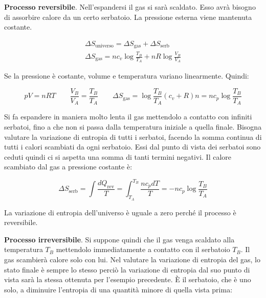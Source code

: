 \begin{figure}[htpb]
\end{figure}
\FloatBarrier

\textbf{Processo reversibile}. Nell'espandersi il gas si sarà scaldato. Esso avrà bisogno di assorbire calore da un certo serbatoio. La pressione esterna viene mantenuta costante.

\begin{gather*}
	\Delta S_{\text{universo} } = \Delta S_{\text{gas} } + \Delta S_{\text{serb} } \\
	\Delta S_{\text{gas} } = nc_v \log \frac{T_B }{T_A } + nR\log \frac{V_B }{V_A }
\end{gather*}

Se la pressione è costante, volume e temperatura variano linearmente. Quindi:

\[
	pV=nRT \qquad \frac{V_B }{V_A } = \frac{T_B }{T_A } \qquad \Delta S_{\text{gas} } = \log \frac{T_B }{T_A }(c_v+R)n = nc_p\log \frac{T_B }{T_A }
\]

Si fa espandere in maniera molto lenta il gas mettendolo a contatto con infiniti serbatoi, fino a che non si passa dalla temperatura iniziale a quella finale. Bisogna valutare la variazione di entropia di tutti i serbatoi, facendo la somma continua di tutti i calori scambiati da ogni serbatoio. Essi dal punto di vista dei serbatoi sono ceduti quindi ci si aspetta una somma di tanti termini negativi. Il calore scambiato dal gas a pressione costante è:

\[
	\Delta S_{\text{serb} } = \int \frac{dQ_{\text{rev} } }{T} = \int_{T_A }^{T_B } \frac{n c_p dT }{T} = - nc_p\log \frac{T_B }{T_A }
\]

La variazione di entropia dell'universo è uguale a zero perché il processo è reversibile.

\textbf{Processo irreversibile}. Si suppone quindi che il gas venga scaldato alla temperatura $T_B$ mettendolo immediatamente a contatto con il serbatoio $T_B$. Il gas scambierà calore solo con lui. Nel valutare la variazione di entropia del gas, lo stato finale è sempre lo stesso perciò la variazione di entropia dal suo punto di vista sarà la stessa ottenuta per l'esempio precedente. È il serbatoio, che è uno solo, a diminuire l'entropia di una quantità minore di quella vista prima:

